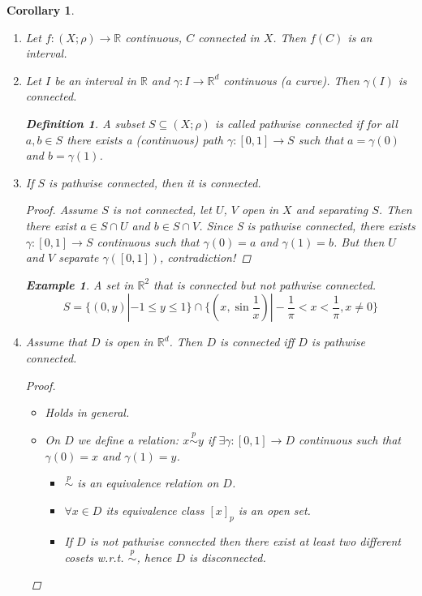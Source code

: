 \documentclass[12pt]{amsbook}
\newtheorem{corollary}[theorem]{Corollary}
\theoremstyle{definition}
\newtheorem{definition}[theorem]{Definition}
\newtheorem{example}[theorem]{Example}
\newcommand{\RR}{{\mathbb R}}
\newcommand{\Ra}{\Rightarrow} %
\newcommand{\La}{\Leftarrow} %
\newcommand{\ra}{\rightarrow} %
\begin{document}
\begin{corollary} %
\begin{enumerate}
\item Let $f: (X; \rho) \ra \RR$ continuous, $C$ connected in $X$. Then $f(C)$ is an interval.
\item Let $I$ be an interval in $\RR$ and $\gamma: I \ra \RR^d$ continuous (a curve). Then $\gamma(I)$ is connected.

\begin{definition}
A subset $S \subseteq (X; \rho)$ is called \emph{pathwise connected} if for all $a, b \in S$ there exists a (continuous) path $\gamma: [0,1] \ra S$ such that $a = \gamma(0)$ and $b = \gamma(1)$.
\end{definition}

\item If $S$ is pathwise connected, then it is connected.

\begin{proof}
Assume $S$ is not connected, let $U$, $V$ open in $X$ and separating $S$. Then there exist $a \in S \cap U$ and $b \in S \cap V$.
Since S is pathwise connected, there exists $\gamma: [0,1] \ra S$ continuous such that $\gamma(0) = a$ and $\gamma(1) = b$. But then $U$ and $V$ separate $\gamma([0,1])$, contradiction!
\end{proof}

\begin{example}
A set in $\RR^2$ that is connected but not pathwise connected.
\begin{equation*}
S = \{(0,y) | -1 \leq y \leq 1 \} \cap \{ (x, \sin \frac{1}{x}) | -\frac{1}{\pi} < x < \frac{1}{\pi}, x \neq 0 \} %
\end{equation*}
\end{example}

\item Assume that $D$ is open in $\RR^d$. Then $D$ is connected iff $D$ is pathwise connected.

\begin{proof}

\begin{itemize}
\item["$\La$"] Holds in general.
\item["$\Ra$"] On $D$ we define a relation: $x \overset{p}\sim y$ if $\exists \gamma: [0,1] \ra D$ continuous such that $\gamma(0) = x$ and $\gamma(1) = y$.
\begin{itemize}
\item[$\bullet$] $\stackrel{p}\sim$ is an equivalence relation on $D$.
\item[$\bullet$] $\forall x \in D$ its equivalence class $[x]_p$ is an open set.
\item[$\bullet$] If $D$ is not pathwise connected then there exist at least two different cosets w.r.t. $\overset{p}\sim$, hence $D$ is disconnected.
\end{itemize}
\end{itemize}
\end{proof}
\end{enumerate}
\end{corollary}
\end{document}
